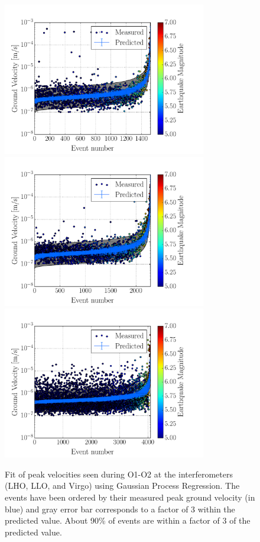 \documentclass[preprint, aps, showpacs]{revtex4-1}
\begin{document}
\begin{figure}[t]
\hspace*{-0.5cm}
 \includegraphics[width=3.5in,trim = 2.5cm 1.5cm 2.5cm 1.5cm, clip=true]{prediction_H1O1O2_GPR.pdf}
 \includegraphics[width=3.5in,trim = 2.5cm 1.5cm 2.5cm 1.5cm, clip=true]{prediction_L1O1O2_GPR.pdf}
 \includegraphics[width=3.5in,trim = 2.5cm 1.5cm 2.5cm 1.5cm, clip=true]{prediction_V1O1O2_GPR.pdf}
 \caption{Fit of peak velocities seen during O1-O2 at the interferometers (LHO, LLO, and Virgo) using Gaussian Process Regression. The events have been ordered by their measured peak ground velocity (in blue) and gray error bar corresponds to a factor of 3 within the predicted value. About 90\% of events are within a factor of 3 of the predicted value.}
 \label{fig:regression}
\end{figure}
\end{document}
